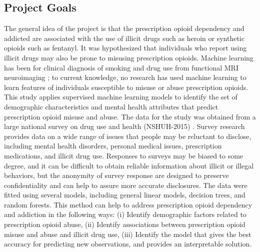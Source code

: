 \documentclass[sigconf]{acmart}
\begin{document}
\subsection{Project Goals} 

The general idea of the project is that the prescription opioid dependency 
and addicted are associated with the use of illicit drugs such as heroin or 
synthetic opioids such as fentanyl. It was hypothesized that individuals who 
report using illicit drugs may also be prone to misusing prescription opioids. 
Machine learning has been for clinical diagnosis of smoking and drug use from 
functional MRI neuroimaging \cite{zhang05, pariyadath14}; to current
knowledge, no research has used machine learning to learn features of 
individuals susceptible to misuse or abuse prescription opioids. This study 
applies supervised machine learning models to identify the set of demographic 
characteristics and mental health attributes that predict prescription opioid 
misuse and abuse. The data for the study was obtained from a large national 
survey on drug use and health (NSHUH-2015) \cite{samhsa16}. Survey research 
provides data on a wide range of issues that people may be reluctant to 
disclose, including mental health disorders, personal medical issues, 
prescription medications, and illicit drug use. Responses to surveys may be 
biased to some degree, and it can be difficult to obtain reliable information 
about illicit or illegal behaviors, but the anonymity of survey response are 
designed to preserve confidentiality and can help to assure more accurate 
disclosures. The data were fitted using several models, including general 
linear models, decision trees, and random forests. This method can help to 
address prescription opioid dependency and addiction in the following ways: 
(i) Identify demographic factors related to prescription opioid abuse, (ii) 
Identify associations between prescription opioid misuse and abuse and 
illicit drug use, (iii) Identify the model that gives the best accuracy
for predicting new observations, and provides an interpretable solution. 


\end{document}
